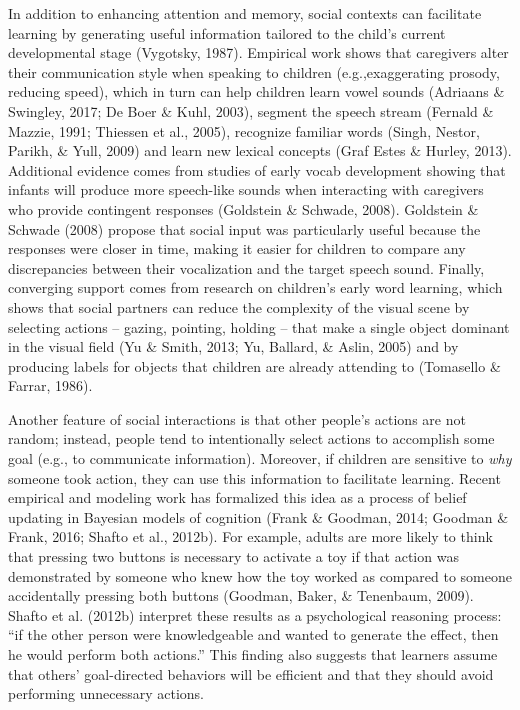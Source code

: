 \documentclass[oneside]{report}
\begin{document}
In addition to enhancing attention and memory, social contexts can
facilitate learning by generating useful information tailored to the
child's current developmental stage (Vygotsky, 1987). Empirical work
shows that caregivers alter their communication style when speaking to
children (e.g.,exaggerating prosody, reducing speed), which in turn can
help children learn vowel sounds (Adriaans \& Swingley, 2017; De Boer \&
Kuhl, 2003), segment the speech stream (Fernald \& Mazzie, 1991;
Thiessen et al., 2005), recognize familiar words (Singh, Nestor, Parikh,
\& Yull, 2009) and learn new lexical concepts (Graf Estes \& Hurley,
2013). Additional evidence comes from studies of early vocab development
showing that infants will produce more speech-like sounds when
interacting with caregivers who provide contingent responses (Goldstein
\& Schwade, 2008). Goldstein \& Schwade (2008) propose that social input
was particularly useful because the responses were closer in time,
making it easier for children to compare any discrepancies between their
vocalization and the target speech sound. Finally, converging support
comes from research on children's early word learning, which shows that
social partners can reduce the complexity of the visual scene by
selecting actions -- gazing, pointing, holding -- that make a single
object dominant in the visual field (Yu \& Smith, 2013; Yu, Ballard, \&
Aslin, 2005) and by producing labels for objects that children are
already attending to (Tomasello \& Farrar, 1986).

Another feature of social interactions is that other people's actions
are not random; instead, people tend to intentionally select actions to
accomplish some goal (e.g., to communicate information). Moreover, if
children are sensitive to \emph{why} someone took action, they can use
this information to facilitate learning. Recent empirical and modeling
work has formalized this idea as a process of belief updating in
Bayesian models of cognition (Frank \& Goodman, 2014; Goodman \& Frank,
2016; Shafto et al., 2012b). For example, adults are more likely to
think that pressing two buttons is necessary to activate a toy if that
action was demonstrated by someone who knew how the toy worked as
compared to someone accidentally pressing both buttons (Goodman, Baker,
\& Tenenbaum, 2009). Shafto et al. (2012b) interpret these results as a
psychological reasoning process: ``if the other person were
knowledgeable and wanted to generate the effect, then he would perform
both actions.'' This finding also suggests that learners assume that
others' goal-directed behaviors will be efficient and that they should
avoid performing unnecessary actions.
\end{document}
